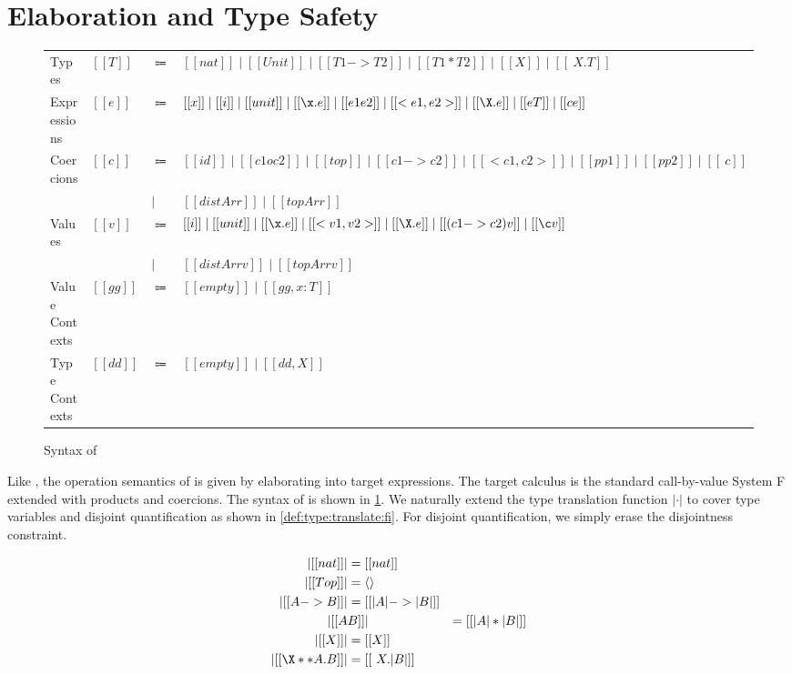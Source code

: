 
\section{Elaboration and Type Safety}
\label{sec:elaboration:fi}



\begin{figure}
  \centering
\begin{tabular}{llll} \toprule
  Types & $[[T]]$ & $\Coloneqq$ & $[[nat]] \mid [[Unit]] \mid [[T1 -> T2]]  \mid [[T1 * T2]] \mid [[X]] \mid [[\ X . T]]$\\
  Expressions & $[[e]]$ & $\Coloneqq$ & $[[x]] \mid [[i]] \mid [[unit]] \mid [[\x . e]] \mid [[e1 e2]] \mid [[< e1 , e2>]] \mid [[\X . e]] \mid [[ e T ]] \mid [[c e]]$ \\
  Coercions & $[[c]]$ & $\Coloneqq$ & $[[id]] \mid [[c1 o c2]] \mid [[top]] \mid [[c1 -> c2]] \mid [[< c1 , c2 >]] \mid [[pp1]] \mid [[pp2]] \mid [[\ c]]$ \\
  & & $\mid$ & $ [[distArr]] \mid [[topArr]] $ \\
  Values & $[[v]]$ & $\Coloneqq$ & $[[i]] \mid [[unit]] \mid [[\x . e]] \mid [[< v1 , v2>]] \mid [[\X . e]] \mid [[ (c1 -> c2) v ]] \mid [[\c v]]  $ \\
  & & $\mid$ & $ [[distArr v]] \mid [[topArr v]] $ \\
  Value Contexts & $[[gg]]$ & $\Coloneqq$ &  $[[empty]] \mid [[gg , x : T]] $ \\
  Type Contexts & $[[dd]]$ & $\Coloneqq$ &  $[[empty]] \mid [[dd , X ]] $ \\ \bottomrule
\end{tabular}
\caption{Syntax of \tnamee}
\label{fig:syntax:fco}
\end{figure}


Like \namee, the operation semantics of \fnamee is given by elaborating into
target expressions. The target calculus \tnamee is the standard call-by-value
System F extended with products and coercions. The syntax of \tnamee is shown in
\cref{fig:syntax:fco}. We naturally extend the type translation function $| \cdot |$
to cover type variables and disjoint quantification as shown in \cref{def:type:translate:fi}.
For disjoint quantification, we simply erase the disjointness constraint.

\begin{definition} \label{def:type:translate:fi}
  \begin{align*}
    | [[nat]] | &= [[nat]] \\
    | [[Top]] | &= \langle \rangle \\
    | [[A -> B]]  | &= [[ | A | -> | B |  ]] \\
    | [[ A & B  ]] | &= [[ | A | * | B |  ]] \\
    | [[ X  ]] | &= [[ X ]] \\
    | [[ \X ** A . B ]] | &= [[ \ X . | B | ]]
  \end{align*}
\end{definition}


